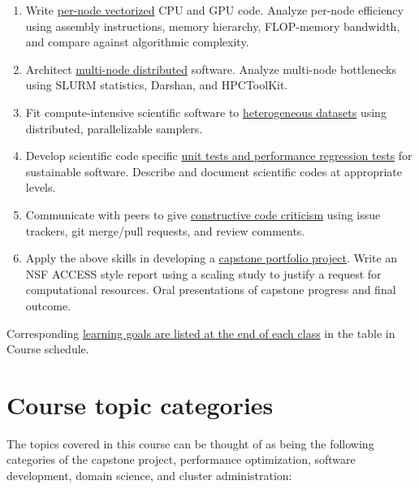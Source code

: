 \documentclass[12pt]{article}
\begin{document}
\begin{enumerate}
\item Write \ul{per-node vectorized} CPU and GPU code.
  Analyze per-node efficiency using assembly instructions, %
  memory hierarchy, FLOP-memory bandwidth, and %
  compare against algorithmic complexity.
\item Architect \ul{multi-node distributed} software.
  Analyze multi-node bottlenecks using SLURM statistics, %
  Darshan, and HPCToolKit.
\item Fit compute-intensive scientific software %
  to \ul{heterogeneous datasets} %
  using distributed, parallelizable samplers.
\item Develop scientific code specific %
  \ul{unit tests and performance regression tests} %
  for sustainable software.
  Describe and document scientific codes at appropriate levels.
\item Communicate with peers to give \ul{constructive code criticism} %
  using issue trackers, git merge/pull requests, and review comments.
\item Apply the above skills in developing a \ul{capstone portfolio project}.
  Write an NSF ACCESS style report %
  using a scaling study to justify a request for computational resources.
  Oral presentations of capstone progress and final outcome.
\end{enumerate}

\noindent
Corresponding \ul{learning goals %
are listed at the end of each class} %
in the table in  Course schedule.

\section{Course topic categories}

The topics covered in this course %
can be thought of as being the following categories of %
the capstone project,
performance optimization, %
software development, %
domain science, and %
cluster administration:
\end{document}
